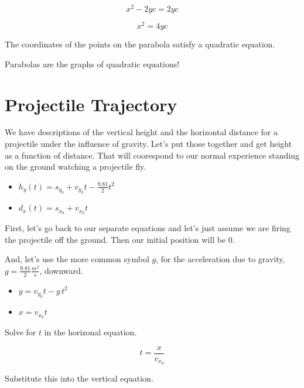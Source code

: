 \documentclass{ximera}
\begin{document}
\[  x^2  - 2 y c  =  2 y c    \]

\[  x^2   =  4 y c    \]


The coordinates of the points on the parabola satisfy a quadratic equation.  


\begin{center}
Parabolas are the graphs of quadratic equations!
\end{center}











\section{Projectile Trajectory}


We have descriptions of the vertical height and the horizontal distance for a projectile under the influence of gravity.  Let's put those together and get height as a function of distance.  That will coorespond to our normal experience standing on the ground watching a projectile fly.


\begin{itemize}
\item $h_y(t) = s_{y_0} + v_{y_0} t - \frac{9.81}{2} t^2$


\item $d_x(t) = s_{x_0} + v_{x_0} t$
\end{itemize}




First, let's go back to our separate equations and let's just assume we are firing the projectile off the ground.  Then our initial position will be $0$.  

And, let's use the more common symbol $g$, for the acceleration due to gravity, $g = \frac{9.81}{2} \frac{m^2}{s}$, downward.




\begin{itemize}
\item $y = v_{y_0} t - g \, t^2$


\item $x = v_{x_0} t$
\end{itemize}


Solve for $t$ in the horizonal equation.


\[ t = \frac{x}{v_{x_0}} \]

Substitute this into the vertical equation.
\end{document}
